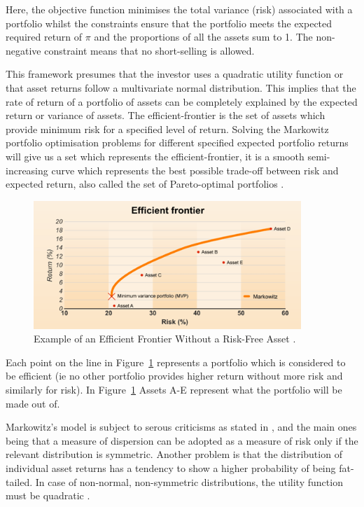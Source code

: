 \documentclass{pdfmx4020}
\begin{document}
    Here, the objective function minimises the total variance (risk) associated with a portfolio whilst the constraints ensure that the portfolio meets the expected required return of $\pi$ and the proportions of all the assets sum to 1. The non-negative constraint means that no short-selling is allowed. 

    This framework presumes that the investor uses a quadratic utility function or that asset returns follow a multivariate normal distribution. This implies that the rate of return of a portfolio of assets can be completely explained by the expected return or variance of assets. The efficient-frontier is the set of assets which provide minimum risk for a specified level of return. Solving the Markowitz portfolio optimisation problems for different specified expected portfolio returns will give us a set which represents the efficient-frontier, it is a smooth semi-increasing curve which represents the best possible trade-off between risk and expected return, also called the set of Pareto-optimal portfolios \cite{pareto}. 

    \begin{figure}[H]
      \centering
        \includegraphics[width=0.9\textwidth]{efficient_frontier}
      \caption{Example of an Efficient Frontier Without a Risk-Free Asset \cite{efficient_frontier}.}
      \label{efficient_frontier}
    \end{figure}

    Each point on the line in Figure~\ref{efficient_frontier} represents a portfolio which is considered to be efficient (ie no other portfolio provides higher return without more risk and similarly for risk). In Figure~\ref{efficient_frontier} Assets A-E represent what the portfolio will be made out of. 

    Markowitz's model is subject to serous criticisms as stated in \cite{crit}, and the main ones being that a measure of dispersion can be adopted as a measure of risk only if the relevant distribution is symmetric. Another problem is that the distribution of individual asset returns has a tendency to show a higher probability of being fat-tailed. In case of non-normal, non-symmetric distributions, the utility function must be quadratic \cite{crit}. 
\end{document}
